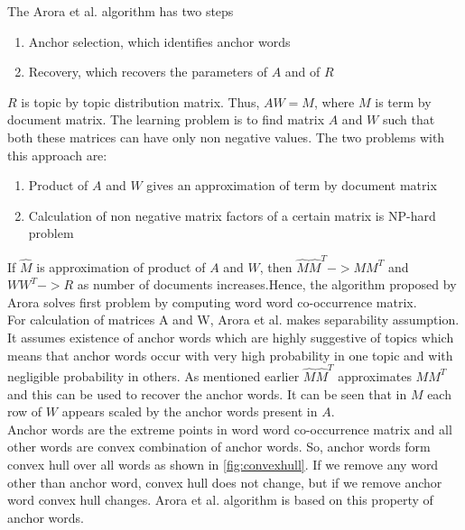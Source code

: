 \documentclass[a4paper,11pt]{article}
\begin{document}
The Arora et al. \cite{tm} algorithm has two steps

\begin{enumerate}
\item Anchor selection, which identifies anchor words
\item Recovery, which recovers the parameters of $A$ and of $R$
\end{enumerate}  

$R$ is topic by topic distribution matrix. Thus, $AW = M$, where $M$ is term by document matrix. The learning problem is to find matrix $A$ and $W$ such that both these matrices can have only non negative values. The two problems with this approach are: \\

\begin{enumerate}
\item Product of $A$ and $W$ gives an approximation of term by document matrix  
\item Calculation of non negative matrix factors of a certain matrix is NP-hard problem
\end{enumerate}

If $\hat{M}$  is approximation of product of $A$ and $W$, then $\hat{M} \hat{M}^T -> M M^T $ and $W W^T -> R$ as number of documents increases.Hence, the algorithm proposed by Arora solves first problem by computing word word co-occurrence matrix. \\

For calculation of matrices A and W, Arora et al. \cite{tm} makes separability assumption. It assumes existence of anchor words which are highly suggestive of topics which means that anchor words occur with very high probability in one topic and with negligible probability in others. As mentioned earlier $\hat{M} \hat{M}^T$ approximates $M M^T $ and this can be used to recover the anchor words. It can be seen that in $M$ each row of $W$ appears scaled by the anchor words present in $A$. \\



Anchor words are the extreme points in word word co-occurrence matrix and all other words are convex combination of anchor words. So, anchor words form convex hull over all words as shown in \ref{fig:convexhull}. If we remove any word other than anchor word, convex hull does not change, but if we remove anchor word convex hull changes. Arora et al. \cite{tm} algorithm is based on this property of anchor words. \\
\end{document}
